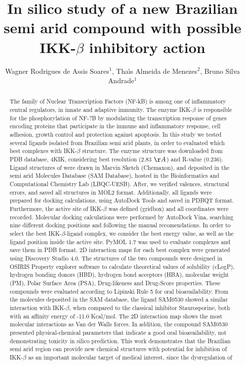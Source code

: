 \documentclass[twoside]{article}
\title{\vspace{-15mm}\fontsize{24pt}{10pt}\selectfont\textbf{In silico study of a new Brazilian semi arid compound with possible IKK-$\beta$ inhibitory action}} %
\author{Wagner Rodrigues de Assis Soares$^1$, Tha\'{\i}s Almeida de Menezes$^2$, Bruno Silva Andrade$^1$}
\affil{1 UNIVERSIDADE ESTADUAL DO SUDOESTE DA BAHIA\\ 2 UNIVERSIDADE ESTADUAL DE FEIRA DE SANTANA\\ }
\date{}
\begin{document}
\maketitle %

\thispagestyle{fancy} %


\begin{abstract}
The family of Nuclear Transcription Factors (NF-kB) is among one of inflammatory central regulators, in innate and adaptive immunity. The enzyme IKK-$\beta$ is responsible for the phosphorylation of NF-?B by modulating the transcription response of genes encoding proteins that participate in the immune and inflammatory response, cell adhesion, growth control and protection against apoptosis. In this study we tested several ligands isolated from Brazilian semi arid plants, in order to evaluated which best complexes with IKK-$\beta$ structure. The enzyme structure was downloaded from PDB database, 4KIK, considering best resolution (2.83 $\AA$) and R-value (0.236). Ligand structures of were drawn in Marvin Sketch (Chemaxon), and deposited in the semi arid Molecules Database (SAM Database), hosted in the Bioinformatics and Computational Chemistry Lab (LBQC-UESB). After, we verified valences, structural errors, and saved all structures in MOL2 format. Additionally, all ligands were prepared for docking calculations, using AutoDock Tools and saved in PDBQT format. Furthermore, the active site of IKK-$\beta$ was defined (gridbox) and all coordinates were recorded. Molecular docking calculations were performed by AutoDock Vina, searching nine different docking positions and following the manual recomendations. In order to select the best IKK-$\beta$-ligand complex, we consider the best energy value, as well as the ligand position inside the active site. PyMOL 1.7 was used to evaluate complexes and save them in PDB format. 2D interaction maps for each best complex were generated using Discovery Studio 4.0. The structures of the two compounds were designed in OSIRIS Property explorer software to calculate theoretical values of solubility (cLogP), hydrogen bonding donors (HBD), hydrogen bond acceptors (HBA), molecular weight (PM), Polar Surface Area (PSA), Drug-likeness and Drug-Score properties. These compounds were evaluated according to Lipinski Rule 5 for oral bioavailability. From the molecules deposited in the SAM database, the ligand SAM0530 showed a similar interaction with IKK-$\beta$, when compared to the classical inhibitor Staurosporine, both with an affinity energy of -11.0 Kcal/mol. The 2D interaction map shows the most molecular interactions as Van der Walls forces. In addition, the compound SAM0530 presented physical-chemical parameters that indicate a good oral bioavailability, not demonstrating toxicity in silico prediction. This work demonstrates that the Brazilian semi arid region can provide new chemical structures with potential for inhibition of IKK-$\beta$ as an important molecular target of medical interest, since the dysregulation of 
\end{abstract}
\end{document}
